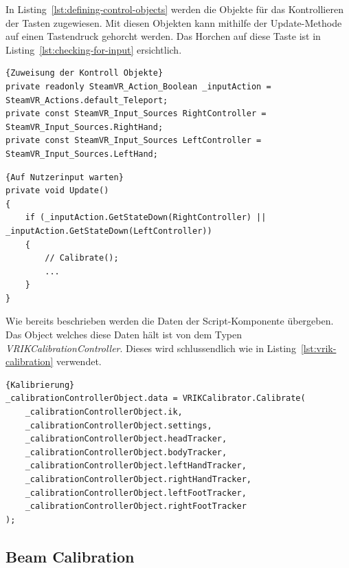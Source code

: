 In Listing~\ref{lst:defining-control-objects} werden die Objekte für das Kontrollieren der Tasten zugewiesen.
Mit diesen Objekten kann mithilfe der Update-Methode auf einen Tastendruck gehorcht werden.
Das Horchen auf diese Taste ist in Listing~\ref{lst:checking-for-input} ersichtlich.

\begin{lstlisting}[language={[Sharp]C},label={lst:defining-control-objects}, caption={Zuweisung der Kontroll Objekt}]{Zuweisung der Kontroll Objekte}
private readonly SteamVR_Action_Boolean _inputAction = SteamVR_Actions.default_Teleport;
private const SteamVR_Input_Sources RightController = SteamVR_Input_Sources.RightHand;
private const SteamVR_Input_Sources LeftController = SteamVR_Input_Sources.LeftHand;
\end{lstlisting}

\begin{lstlisting}[language={[Sharp]C},label={lst:checking-for-input}, caption={Auf Nutzerinput warten}]{Auf Nutzerinput warten}
private void Update()
{
    if (_inputAction.GetStateDown(RightController) || _inputAction.GetStateDown(LeftController))
    {
        // Calibrate();
        ...
    }
}
\end{lstlisting}

Wie bereits beschrieben werden die Daten der Script-Komponente übergeben.
Das Object welches diese Daten hält ist von dem Typen \emph{VRIKCalibrationController}.
Dieses wird schlussendlich wie in Listing~\ref{lst:vrik-calibration} verwendet.

\begin{lstlisting}[language={[Sharp]C},label={lst:vrik-calibration}, caption={Kalibrierung}]{Kalibrierung}
_calibrationControllerObject.data = VRIKCalibrator.Calibrate(
    _calibrationControllerObject.ik,
    _calibrationControllerObject.settings,
    _calibrationControllerObject.headTracker,
    _calibrationControllerObject.bodyTracker,
    _calibrationControllerObject.leftHandTracker,
    _calibrationControllerObject.rightHandTracker,
    _calibrationControllerObject.leftFootTracker,
    _calibrationControllerObject.rightFootTracker
);
\end{lstlisting}


\subsection{Beam Calibration}
\label{subsec:beam-calibration}


